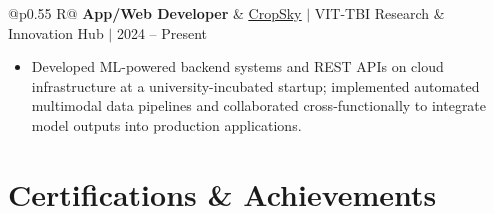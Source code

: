 \documentclass[a4paper,10pt]{article}
\newcommand{\ulink}[2]{\href{#1}{\uline{#2}}}
\newcommand{\subheading}[1]{{\color[HTML]{0A0A0A}\fontsize{12}{14}\selectfont\bfseries #1}}
\newcommand{\meta}[1]{{\color[HTML]{5C5C5C}\fontsize{10.5}{12.5}\selectfont #1}}
\begin{document}
\begin{tabularx}{\linewidth}{@{}p{0.55\linewidth} R@{}}
\subheading{App/Web Developer} & \meta{\ulink{https://sites.google.com/view/cropsky/home}{CropSky} $|$ VIT-TBI Research \& Innovation Hub $|$ 2024 -- Present}
\end{tabularx}
\begin{itemize}[nosep, leftmargin=1.5em, itemsep=1pt, topsep=2pt]
\item {\color[HTML]{0A0A0A}\fontsize{11}{14}\selectfont
Developed ML-powered backend systems and REST APIs on cloud infrastructure at a university-incubated startup; implemented automated multimodal data pipelines and collaborated cross-functionally to integrate model outputs into production applications.}
\end{itemize}

\vspace{2pt}

\section{Certifications \& Achievements}
\vspace{2pt}
\end{document}
